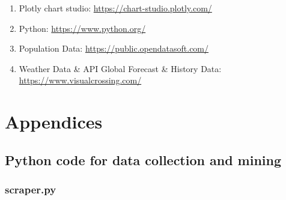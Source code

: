 \documentclass[a4paper,12pt]{report}
\begin{document}
\begin{enumerate}
\item Plotly chart studio: \href{https://chart-studio.plotly.com/}{https://chart-studio.plotly.com/}

\item Python: \href{https://www.python.org/}{https://www.python.org/}

\item Population Data: \href{https://public.opendatasoft.com/}{https://public.opendatasoft.com/}

\item Weather Data \& API Global Forecast \& History Data: \href{https://www.visualcrossing.com/}{https://www.visualcrossing.com/}

\end{enumerate}

\chapter{Appendices}

\section{Python code for data collection and mining}

\subsection{scraper.py}
\end{document}
